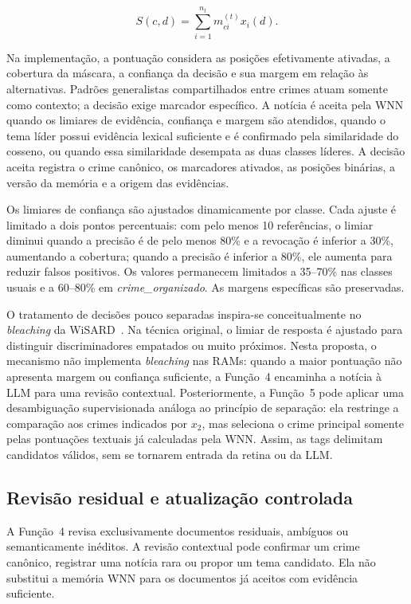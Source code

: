 \begin{equation}
S(c,d)=\sum_{i=1}^{n_t}m_{ci}^{(t)}x_i(d).
\end{equation}

Na implementação, a pontuação considera as posições efetivamente ativadas, a cobertura da máscara, a confiança da decisão e sua margem em relação às alternativas. Padrões generalistas compartilhados entre crimes atuam somente como contexto; a decisão exige marcador específico. A notícia é aceita pela WNN quando os limiares de evidência, confiança e margem são atendidos, quando o tema líder possui evidência lexical suficiente e é confirmado pela similaridade do cosseno, ou quando essa similaridade desempata as duas classes líderes. A decisão aceita registra o crime canônico, os marcadores ativados, as posições binárias, a versão da memória e a origem das evidências.

Os limiares de confiança são ajustados dinamicamente por classe. Cada ajuste é limitado a dois pontos percentuais: com pelo menos 10 referências, o limiar diminui quando a precisão é de pelo menos 80\% e a revocação é inferior a 30\%, aumentando a cobertura; quando a precisão é inferior a 80\%, ele aumenta para reduzir falsos positivos. Os valores permanecem limitados a 35--70\% nas classes usuais e a 60--80\% em \textit{crime\_organizado}. As margens específicas são preservadas.

O tratamento de decisões pouco separadas inspira-se conceitualmente no 
\textit{bleaching} da WiSARD~\cite{carneiro2017weightless}. Na técnica original, o limiar de resposta é ajustado para distinguir discriminadores empatados ou muito próximos. Nesta proposta, o mecanismo não implementa \textit{bleaching} nas RAMs: quando a maior pontuação não apresenta margem ou confiança suficiente, a Função~4 encaminha a notícia à LLM para uma revisão contextual. Posteriormente, a Função~5 pode aplicar uma desambiguação supervisionada análoga ao princípio de separação: ela restringe a comparação aos crimes indicados por $x_2$, mas seleciona o crime principal somente pelas pontuações textuais já calculadas pela WNN. Assim, as tags delimitam candidatos válidos, sem se tornarem entrada da retina ou da LLM.

\subsection{Revisão residual e atualização controlada}

A Função~4 revisa exclusivamente documentos residuais, ambíguos ou semanticamente inéditos. A revisão contextual pode confirmar um crime canônico, registrar uma notícia rara ou propor um tema candidato. Ela não substitui a memória WNN para os documentos já aceitos com evidência suficiente.

